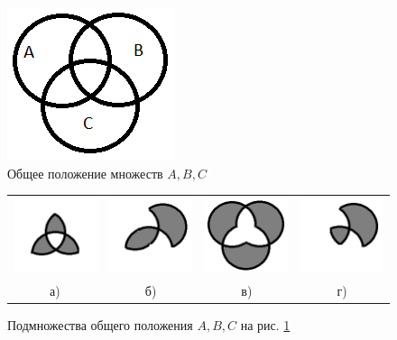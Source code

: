 \begin{enumerate}
    \begin{figure}[h]
        \centering
        \includegraphics{fig/commonABCset}
        \caption{Общее положение множеств $A,B,C$}\label{fig:commonABCset}
    \end{figure} 
    
    \begin{figure}[!ht]
        \centering
        \begin{tabular}{||c||c||c||c||}
        \hline\hline
        \includegraphics[width=.2\textwidth]{fig/ABCsubset1}
            & \includegraphics[width=.2\textwidth]{fig/ABCsubset2}
                & \includegraphics[width=.2\textwidth]{fig/ABCsubset3}
                    & \includegraphics[width=.2\textwidth]{fig/ABCsubset4}
                        \\
        а)  &б) &в) &г) \\ 
        \hline\hline
        \end{tabular}
        \caption{Подмножества общего положения $A,B,C$ на рис. \ref{fig:commonABCset}}
        \label{fig:sets:ABCsubsets}
    \end{figure} 
    

\end{enumerate}
